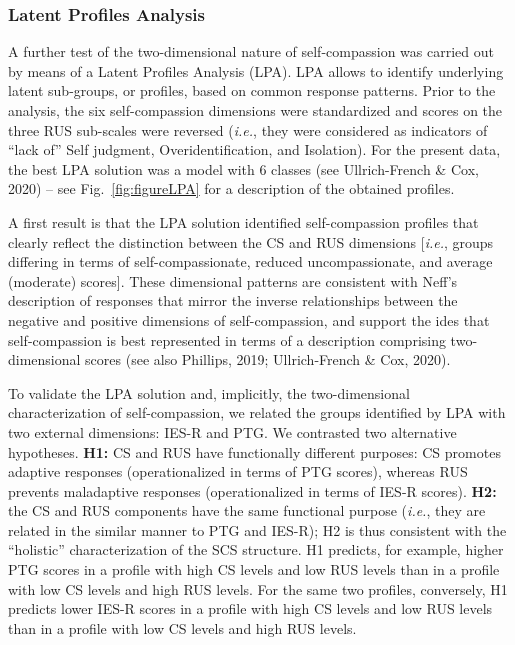 \documentclass[
  english,
  man,floatsintext]{apa7}
\begin{document}
\hypertarget{latent-profiles-analysis}{%
\subsubsection{Latent Profiles Analysis}\label{latent-profiles-analysis}}

A further test of the two-dimensional nature of self-compassion was carried out by means of a Latent Profiles Analysis (LPA). LPA allows to identify underlying latent sub-groups, or profiles, based on common response patterns. Prior to the analysis, the six self-compassion dimensions were standardized and scores on the three RUS sub-scales were reversed (\emph{i.e.}, they were considered as indicators of ``lack of'' Self judgment, Overidentification, and Isolation). For the present data, the best LPA solution was a model with 6 classes (see Ullrich-French \& Cox, 2020) -- see Fig.~\ref{fig:figureLPA} for a description of the obtained profiles.

A first result is that the LPA solution identified self-compassion profiles that clearly reflect the distinction between the CS and RUS dimensions {[}\emph{i.e.}, groups differing in terms of self-compassionate, reduced uncompassionate, and average (moderate) scores{]}. These dimensional patterns are consistent with Neff's description of responses that mirror the inverse relationships between the negative and positive dimensions of self-compassion, and support the ides that self-compassion is best represented in terms of a description comprising two-dimensional scores (see also Phillips, 2019; Ullrich-French \& Cox, 2020).

To validate the LPA solution and, implicitly, the two-dimensional characterization of self-compassion, we related the groups identified by LPA with two external dimensions: IES-R and PTG. We contrasted two alternative hypotheses. \textbf{H1:} CS and RUS have functionally different purposes: CS promotes adaptive responses (operationalized in terms of PTG scores), whereas RUS prevents maladaptive responses (operationalized in terms of IES-R scores). \textbf{H2:} the CS and RUS components have the same functional purpose (\emph{i.e.}, they are related in the similar manner to PTG and IES-R); H2 is thus consistent with the ``holistic'' characterization of the SCS structure. H1 predicts, for example, higher PTG scores in a profile with high CS levels and low RUS levels than in a profile with low CS levels and high RUS levels. For the same two profiles, conversely, H1 predicts lower IES-R scores in a profile with high CS levels and low RUS levels than in a profile with low CS levels and high RUS levels.
\end{document}
